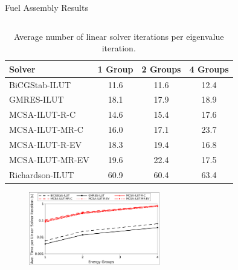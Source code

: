 \documentclass{beamer}
\begin{document}
\begin{frame}{Fuel Assembly Results}

  \begin{columns}

    \begin{column}{0.5\textwidth}

      {\tiny
      \begin{table}[h!]
        \begin{center}
          \begin{tabular}{lccc}\hline\hline
            \multicolumn{1}{l}{Solver}&
            \multicolumn{1}{c}{1 Group}&
            \multicolumn{1}{c}{2 Groups}&
            \multicolumn{1}{c}{4 Groups}\\
            \hline
            BiCGStab-ILUT & 11.6 & 11.6 & 12.4 \\ 
            GMRES-ILUT & 18.1 & 17.9 & 18.9 \\
            MCSA-ILUT-R-C & 14.6 & 15.4 & 17.6 \\
            MCSA-ILUT-MR-C & 16.0 & 17.1 & 23.7 \\
            MCSA-ILUT-R-EV & 18.3 & 19.4 & 16.8 \\
            MCSA-ILUT-MR-EV & 19.6 & 22.4 & 17.5 \\
            Richardson-ILUT & 60.9 & 60.4 & 63.4 \\
            \hline\hline
          \end{tabular}
        \end{center}
        \caption{Average number of linear solver iterations per
          eigenvalue iteration.}
      \end{table}
      }

      \begin{figure}[htpb!]
        \begin{center}
          \includegraphics[width=2.25in]{solver_time.pdf}
        \end{center}
      \end{figure}

    \end{column}


\end{columns}
\end{frame}
\end{document}
